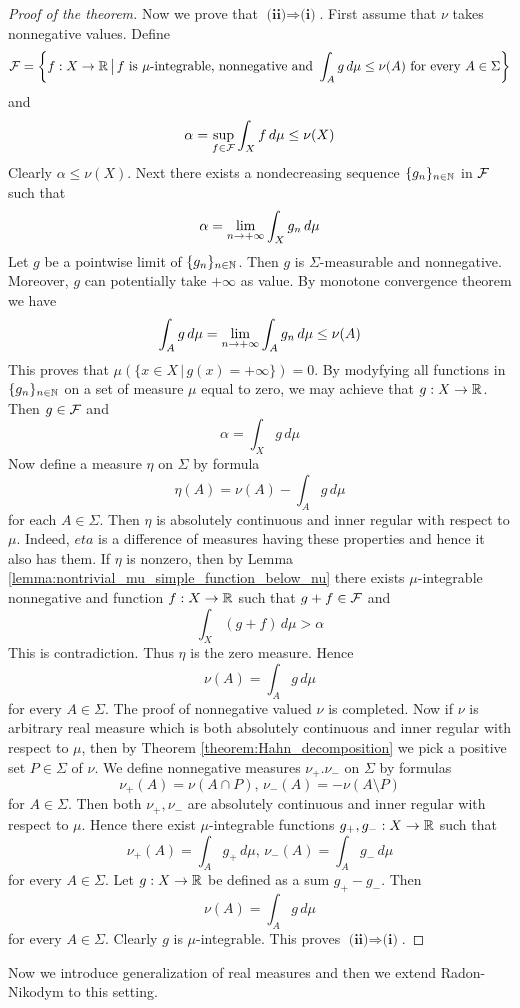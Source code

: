 \begin{proof}[Proof of the theorem]
    Now we prove that $\textbf{(ii)}\Rightarrow \textbf{(i)}$. First assume that $\nu$ takes nonnegative values. Define
    $${\mathcal F} = \bigg\{f:X\rightarrow {\mathbb R}\,\big|\,f\mbox{ is }\mu\mbox{-integrable, nonnegative and }\int_Ag\,d\mu \leq \nu(A)\mbox{ for every }A \in \Sigma\bigg\}$$
    and
    $$\alpha = \sup_{f \in {\mathcal F}}\int_Xf\,d\mu \leq \nu(X)$$
    Clearly $\alpha \leq \nu(X)$. Next there exists a nondecreasing sequence $\{g_n\}_{n\in {\mathbb N}}$ in ${\mathcal F}$ such that
    $$\alpha = \lim_{n\rightarrow +\infty}\int_Xg_n\,d\mu$$
    Let $g$ be a pointwise limit of $\{g_n\}_{n\in {\mathbb N}}$. Then $g$ is $\Sigma$-measurable and nonnegative. Moreover, $g$ can potentially take $+\infty$ as value. By monotone convergence theorem we have
    $$\int_Ag\,d\mu = \lim_{n\rightarrow +\infty}\int_Ag_n\,d\mu \leq \nu(A)$$
    This proves that $\mu(\{x\in X\,|\,g(x) = +\infty\}) = 0$. By modyfying all functions in $\{g_n\}_{n\in {\mathbb N}}$ on a set of measure $\mu$ equal to zero, we may achieve that $g:X \rightarrow {\mathbb R}$. Then $g \in {\mathcal F}$ and
    $$\alpha = \int_Xg\,d\mu$$
    Now define a measure $\eta$ on $\Sigma$ by formula
    $$\eta(A) = \nu(A) - \int_Ag\,d\mu$$
    for each $A \in \Sigma$. Then $\eta$ is absolutely continuous and inner regular with respect to $\mu$. Indeed, $eta$ is a difference of measures having these properties and hence it also has them. If $\eta$ is nonzero, then by Lemma \ref{lemma:nontrivial_mu_simple_function_below_nu} there exists $\mu$-integrable nonnegative and function $f:X\rightarrow {\mathbb R}$ such that $g + f \in {\mathcal F}$ and
    $$\int_X\left(g + f\right)\,d\mu > \alpha$$
    This is contradiction. Thus $\eta$ is the zero measure. Hence
    $$\nu(A) = \int_Ag\,d\mu$$
    for every $A \in \Sigma$. The proof of nonnegative valued $\nu$ is completed. Now if $\nu$ is arbitrary real measure which is both absolutely continuous and inner regular with respect to $\mu$, then by Theorem \ref{theorem:Hahn_decomposition} we pick a positive set $P \in \Sigma$ of $\nu$. We define nonnegative measures $\nu_+.\nu_-$ on $\Sigma$ by formulas
    $$\nu_+(A) = \nu(A\cap P),\,\nu_-(A) = -\nu(A\setminus P)$$
    for $A \in \Sigma$. Then both $\nu_+,\nu_-$ are absolutely continuous and inner regular with respect to $\mu$. Hence there exist $\mu$-integrable functions $g_+,g_-:X\rightarrow {\mathbb R}$ such that
    $$\nu_+(A) = \int_Ag_+\,d\mu,\,\nu_-(A) = \int_Ag_-\,d\mu$$
    for every $A \in \Sigma$. Let $g:X\rightarrow {\mathbb R}$ be defined as a sum $g_+ - g_-$. Then
    $$\nu(A) = \int_Ag\,d\mu$$
    for every $A \in \Sigma$. Clearly $g$ is $\mu$-integrable. This proves $\textbf{(ii)}\Rightarrow \textbf{(i)}$.
\end{proof}
\noindent
Now we introduce generalization of real measures and then we extend Radon-Nikodym to this setting.

